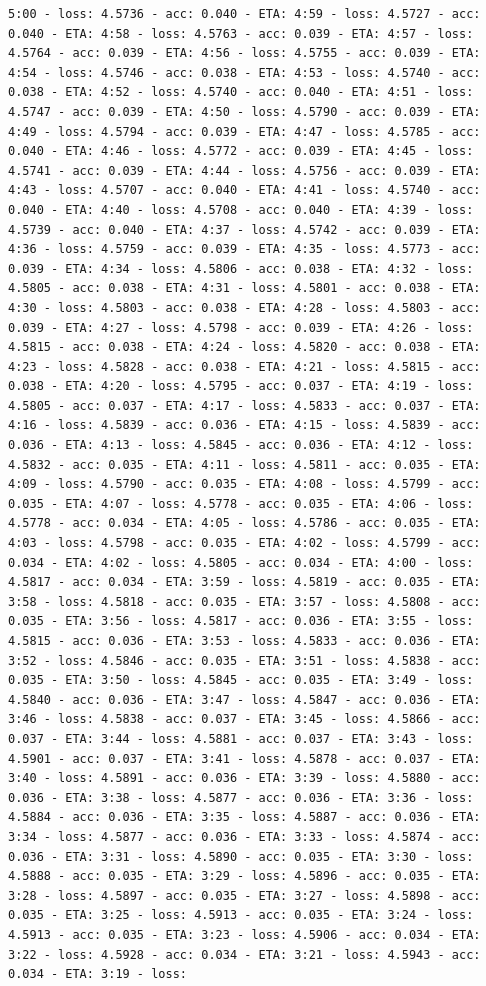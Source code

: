 \documentclass[11pt]{article}
\begin{document}
\begin{Verbatim}[commandchars=\\\{\}]
5:00 - loss: 4.5736 - acc: 0.040 - ETA: 4:59 - loss: 4.5727 - acc: 0.040 - ETA: 4:58 - loss: 4.5763 - acc: 0.039 - ETA: 4:57 - loss: 4.5764 - acc: 0.039 - ETA: 4:56 - loss: 4.5755 - acc: 0.039 - ETA: 4:54 - loss: 4.5746 - acc: 0.038 - ETA: 4:53 - loss: 4.5740 - acc: 0.038 - ETA: 4:52 - loss: 4.5740 - acc: 0.040 - ETA: 4:51 - loss: 4.5747 - acc: 0.039 - ETA: 4:50 - loss: 4.5790 - acc: 0.039 - ETA: 4:49 - loss: 4.5794 - acc: 0.039 - ETA: 4:47 - loss: 4.5785 - acc: 0.040 - ETA: 4:46 - loss: 4.5772 - acc: 0.039 - ETA: 4:45 - loss: 4.5741 - acc: 0.039 - ETA: 4:44 - loss: 4.5756 - acc: 0.039 - ETA: 4:43 - loss: 4.5707 - acc: 0.040 - ETA: 4:41 - loss: 4.5740 - acc: 0.040 - ETA: 4:40 - loss: 4.5708 - acc: 0.040 - ETA: 4:39 - loss: 4.5739 - acc: 0.040 - ETA: 4:37 - loss: 4.5742 - acc: 0.039 - ETA: 4:36 - loss: 4.5759 - acc: 0.039 - ETA: 4:35 - loss: 4.5773 - acc: 0.039 - ETA: 4:34 - loss: 4.5806 - acc: 0.038 - ETA: 4:32 - loss: 4.5805 - acc: 0.038 - ETA: 4:31 - loss: 4.5801 - acc: 0.038 - ETA: 4:30 - loss: 4.5803 - acc: 0.038 - ETA: 4:28 - loss: 4.5803 - acc: 0.039 - ETA: 4:27 - loss: 4.5798 - acc: 0.039 - ETA: 4:26 - loss: 4.5815 - acc: 0.038 - ETA: 4:24 - loss: 4.5820 - acc: 0.038 - ETA: 4:23 - loss: 4.5828 - acc: 0.038 - ETA: 4:21 - loss: 4.5815 - acc: 0.038 - ETA: 4:20 - loss: 4.5795 - acc: 0.037 - ETA: 4:19 - loss: 4.5805 - acc: 0.037 - ETA: 4:17 - loss: 4.5833 - acc: 0.037 - ETA: 4:16 - loss: 4.5839 - acc: 0.036 - ETA: 4:15 - loss: 4.5839 - acc: 0.036 - ETA: 4:13 - loss: 4.5845 - acc: 0.036 - ETA: 4:12 - loss: 4.5832 - acc: 0.035 - ETA: 4:11 - loss: 4.5811 - acc: 0.035 - ETA: 4:09 - loss: 4.5790 - acc: 0.035 - ETA: 4:08 - loss: 4.5799 - acc: 0.035 - ETA: 4:07 - loss: 4.5778 - acc: 0.035 - ETA: 4:06 - loss: 4.5778 - acc: 0.034 - ETA: 4:05 - loss: 4.5786 - acc: 0.035 - ETA: 4:03 - loss: 4.5798 - acc: 0.035 - ETA: 4:02 - loss: 4.5799 - acc: 0.034 - ETA: 4:02 - loss: 4.5805 - acc: 0.034 - ETA: 4:00 - loss: 4.5817 - acc: 0.034 - ETA: 3:59 - loss: 4.5819 - acc: 0.035 - ETA: 3:58 - loss: 4.5818 - acc: 0.035 - ETA: 3:57 - loss: 4.5808 - acc: 0.035 - ETA: 3:56 - loss: 4.5817 - acc: 0.036 - ETA: 3:55 - loss: 4.5815 - acc: 0.036 - ETA: 3:53 - loss: 4.5833 - acc: 0.036 - ETA: 3:52 - loss: 4.5846 - acc: 0.035 - ETA: 3:51 - loss: 4.5838 - acc: 0.035 - ETA: 3:50 - loss: 4.5845 - acc: 0.035 - ETA: 3:49 - loss: 4.5840 - acc: 0.036 - ETA: 3:47 - loss: 4.5847 - acc: 0.036 - ETA: 3:46 - loss: 4.5838 - acc: 0.037 - ETA: 3:45 - loss: 4.5866 - acc: 0.037 - ETA: 3:44 - loss: 4.5881 - acc: 0.037 - ETA: 3:43 - loss: 4.5901 - acc: 0.037 - ETA: 3:41 - loss: 4.5878 - acc: 0.037 - ETA: 3:40 - loss: 4.5891 - acc: 0.036 - ETA: 3:39 - loss: 4.5880 - acc: 0.036 - ETA: 3:38 - loss: 4.5877 - acc: 0.036 - ETA: 3:36 - loss: 4.5884 - acc: 0.036 - ETA: 3:35 - loss: 4.5887 - acc: 0.036 - ETA: 3:34 - loss: 4.5877 - acc: 0.036 - ETA: 3:33 - loss: 4.5874 - acc: 0.036 - ETA: 3:31 - loss: 4.5890 - acc: 0.035 - ETA: 3:30 - loss: 4.5888 - acc: 0.035 - ETA: 3:29 - loss: 4.5896 - acc: 0.035 - ETA: 3:28 - loss: 4.5897 - acc: 0.035 - ETA: 3:27 - loss: 4.5898 - acc: 0.035 - ETA: 3:25 - loss: 4.5913 - acc: 0.035 - ETA: 3:24 - loss: 4.5913 - acc: 0.035 - ETA: 3:23 - loss: 4.5906 - acc: 0.034 - ETA: 3:22 - loss: 4.5928 - acc: 0.034 - ETA: 3:21 - loss: 4.5943 - acc: 0.034 - ETA: 3:19 - loss: 
\end{Verbatim}
\end{document}
